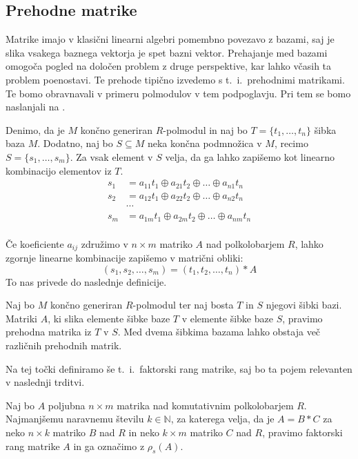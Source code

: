 \documentclass[mat1]{fmfdelo}
\newcommand{\N}{\mathbb{N}}
\begin{document}
\subsection{Prehodne matrike}\label{subsect:prehodmat}
Matrike imajo v klasični linearni algebri pomembno povezavo z bazami, saj je slika vsakega baznega vektorja je spet bazni vektor. Prehajanje med bazami omogoča pogled na določen problem z druge perspektive, kar lahko včasih ta problem poenostavi. Te prehode tipično izvedemo s t.~i.\ prehodnimi matrikami. Te bomo obravnavali v primeru polmodulov v tem podpoglavju. Pri tem se bomo naslanjali na \cite[poglavje 3]{bib:Tanbase}.

Denimo, da je $M$ končno generiran $R$-polmodul in naj bo $T = \{t_1, \ldots, t_n\}$ šibka baza $M$. Dodatno, naj bo $S\subseteq M$ neka končna podmnožica v $M$, recimo $S = \{s_1, \ldots, s_m\}$. Za vsak element v $S$ velja, da ga lahko zapišemo kot linearno kombinacijo elementov iz $T$. \begin{align*}
	s_1 &= a_{11}t_1 \oplus a_{21}t_2 \oplus \ldots \oplus a_{n1}t_n \\
	s_2 &= a_{12}t_1 \oplus a_{22}t_2 \oplus \ldots \oplus a_{n2}t_n \\
	&\cdots \\
	s_m &= a_{1m}t_1 \oplus a_{2m}t_2 \oplus \ldots \oplus a_{nm}t_n \\
\end{align*}

Če koeficiente $a_{ij}$ združimo v $n\times m$ matriko $A$ nad polkolobarjem $R$, lahko zgornje linearne kombinacije zapišemo v matrični obliki:$$
(s_1, s_2, \ldots, s_m ) = (t_1, t_2, \ldots, t_n) * A$$ 
To nas privede do naslednje definicije.

\begin{definicija}\label{def:prehodmat}
	Naj bo $M$ končno generiran $R$-polmodul ter naj bosta $T$ in $S$ njegovi šibki bazi. Matriki $A$, ki slika elemente šibke baze $T$ v elemente šibke baze $S$, pravimo prehodna matrika iz $T$ v $S$. Med dvema šibkima bazama lahko obstaja več različnih prehodnih matrik.
\end{definicija}

Na tej točki definiramo še t.~i.~faktorski rang matrike, saj bo ta pojem relevanten v naslednji trditvi.

\begin{definicija}\label{def:faktorrang}
	Naj bo $A$ poljubna $n\times m$ matrika nad komutativnim polkolobarjem $R$. Najmanjšemu naravnemu številu $k\in \N$, za katerega velja, da je $A= B*C$ za neko $n\times k$ matriko $B$ nad $R$ in neko $k\times m$ matriko $C$ nad $R$, pravimo faktorski rang matrike $A$ in ga označimo z $\rho_s(A)$.
\end{definicija}
\end{document}
